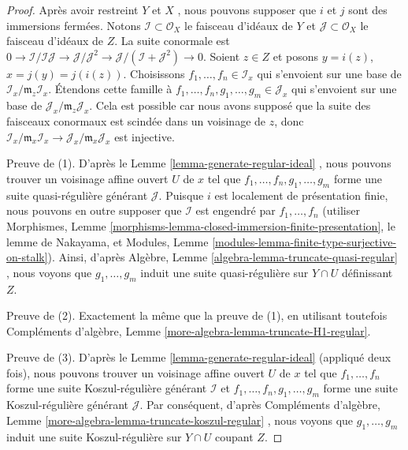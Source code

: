\begin{proof}
Après avoir restreint  $Y$  et  $X$ , nous pouvons supposer que
 $i$  et  $j$  sont des immersions fermées. Notons  $\mathcal{I} \subset \mathcal{O}_X$  le
faisceau d'idéaux de  $Y$  et  $\mathcal{J} \subset \mathcal{O}_X$  le faisceau d'idéaux de
 $Z$. La suite conormale est  $0 \to \mathcal{I}/\mathcal{I}\mathcal{J}
\to \mathcal{J}/\mathcal{J}^2 \to
\mathcal{J}/(\mathcal{I} + \mathcal{J}^2) \to 0$. Soient  $z \in Z$  et posons
 $y = i(z)$,  $x = j(y) = j(i(z))$. Choisissons  $f_1, \ldots, f_n \in \mathcal{I}_x$  qui s'envoient sur une
base de  $\mathcal{I}_x/\mathfrak m_z\mathcal{I}_x$. Étendons cette famille à  $f_1, \ldots, f_n, g_1, \ldots, g_m \in \mathcal{J}_x$  qui s'envoient sur une base
de  $\mathcal{J}_x/\mathfrak m_z\mathcal{J}_x$. Cela est possible car nous avons supposé que la suite des
faisceaux conormaux est scindée dans un voisinage de  $z$, donc
 $\mathcal{I}_x/\mathfrak m_x\mathcal{I}_x \to
\mathcal{J}_x/\mathfrak m_x\mathcal{J}_x$  est injective.

\medskip\noindent
Preuve de (1). D'après le Lemme  \ref{lemma-generate-regular-ideal} , nous pouvons trouver un voisinage
affine ouvert  $U$  de  $x$  tel que  $f_1, \ldots, f_n, g_1, \ldots, g_m$  forme une suite
quasi-régulière générant  $\mathcal{J}$. Puisque  $i$  est localement de
présentation finie, nous pouvons en outre supposer que  $\mathcal{I}$  est engendré
par  $f_1, \ldots, f_n$  (utiliser Morphismes, Lemme  \ref{morphisms-lemma-closed-immersion-finite-presentation}, le lemme de Nakayama,
et Modules, Lemme  \ref{modules-lemma-finite-type-surjective-on-stalk}). Ainsi, d'après Algèbre, Lemme  \ref{algebra-lemma-truncate-quasi-regular} , nous
voyons que  $g_1, \ldots, g_m$  induit une suite quasi-régulière sur  $Y \cap U$ 
définissant  $Z$.

\medskip\noindent
Preuve de (2). Exactement la même que la preuve de (1), en utilisant toutefois Compléments
d'algèbre, Lemme  \ref{more-algebra-lemma-truncate-H1-regular}.

\medskip\noindent
Preuve de (3). D'après le Lemme  \ref{lemma-generate-regular-ideal}  (appliqué deux fois), nous pouvons
trouver un voisinage affine ouvert  $U$  de  $x$  tel que
 $f_1, \ldots, f_n$  forme une suite Koszul-régulière générant  $\mathcal{I}$  et
 $f_1, \ldots, f_n, g_1, \ldots, g_m$  forme une suite Koszul-régulière générant  $\mathcal{J}$. Par
conséquent, d'après Compléments d'algèbre, Lemme  \ref{more-algebra-lemma-truncate-koszul-regular} , nous voyons que
 $g_1, \ldots, g_m$  induit une suite Koszul-régulière sur  $Y \cap U$  coupant
 $Z$.
\end{proof}

